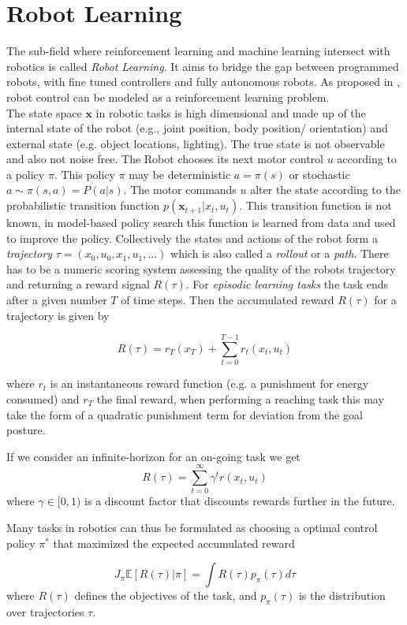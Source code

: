 \section{Robot Learning}
The sub-field where reinforcement learning and machine learning
intersect with robotics is called \textit{Robot Learning}. It aims to bridge
the gap between programmed robots,
with fine tuned controllers  and fully autonomous robots.
As proposed in \citet{deisenroth2013survey}, robot control can be modeled as
a reinforcement learning problem.  \\
The state space $\mathbf{x}$ in robotic tasks is high dimensional and made up of
the internal state of the robot (e.g., joint position, body position/ orientation)
and external state (e.g. object locations, lighting). The true state is
not observable and also not noise free. 
The Robot chooses its next motor control $u$ according to a policy $\pi$.
This policy $\pi$ may
be deterministic $a = \pi(s)$ or stochastic $a \sim \pi(s,a) = P(a | s)$.
The motor commands $u$ alter the state according to the probabilistic
transition function $p(\mathbf{x}_{t+1} | x_t, u_t)$. This transition function
is not known, in model-based policy search this function is learned from data and
used to improve the policy.
Collectively the states and actions of the robot form a
\textit{trajectory} $\tau = (x_0, u_0, x_1, u_1,...)$ which is also called
a \textit{rollout} or a \textit{path}.
There has to be a numeric scoring system assessing the quality
of the robots trajectory and returning a reward signal $R(\tau)$.
For \textit{episodic learning tasks} the task ends after a given number $T$ of time
steps. Then the accumulated reward $R(\tau)$ for a trajectory is given by

$$ R(\tau) = r_T(x_T) + \sum^{T-1}_{t=0} r_t(x_t,u_t) $$

where $r_t$ is an instantaneous reward function (e.g. a punishment for energy consumed)
and $r_T$ the final reward, when performing a reaching task this may take the
form of a quadratic punishment term for deviation from the goal posture.

If we consider an infinite-horizon for an on-going task we get
$$ R(\tau) = \sum^{\infty}_{t=0} \gamma^t r(x_t, u_t) $$
where $\gamma \in [0,1)$ is a discount factor that discounts rewards further in the future.

Many tasks in robotics can thus be formulated as choosing a optimal control
policy $\pi^*$ that maximized the expected accumulated reward

$$ J_{\pi} \mathbb{E}[R(\tau) | \pi] = \int R(\tau) p_{\pi}(\tau) d\tau $$
where $R(\tau)$ defines the objectives of the task, and $p_{\pi}(\tau)$ is the
distribution over trajectories $\tau$.

